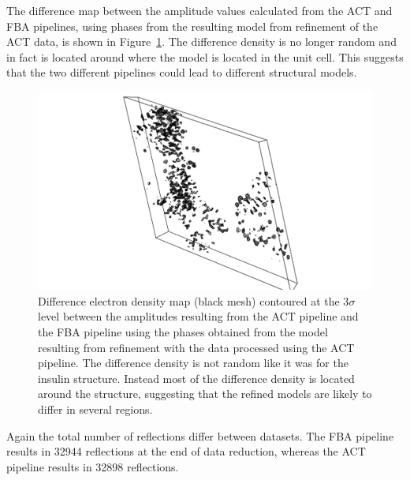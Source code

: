 The difference map between the amplitude values calculated from the ACT and FBA pipelines, using phases from the resulting model from refinement of the ACT data, is shown in Figure~\ref{fig:Difference electron density map - C.Esp1396I}.
The difference density is no longer random and in fact is located around where the model is located in the unit cell.
This suggests that the two different pipelines could lead to different structural models.
\begin{figure}[ht!]
    \centering
    \includegraphics[width=1.0\textwidth]{figures/datared/CPROT_diff_map.png}
    \caption{Difference electron density map (black mesh) contoured at the 3$\sigma$ level between the amplitudes resulting from the ACT pipeline and the FBA pipeline using the phases obtained from the model resulting from refinement with the data processed using the ACT pipeline.
    The difference density is not random like it was for the insulin structure.
    Instead most of the difference density is located around the structure, suggesting that the refined models are likely to differ in several regions.}
    \label{fig:Difference electron density map - C.Esp1396I}
\end{figure}

Again the total number of reflections differ between datasets.
The FBA pipeline results in 32944 reflections at the end of data reduction, whereas the ACT pipeline results in 32898 reflections.

